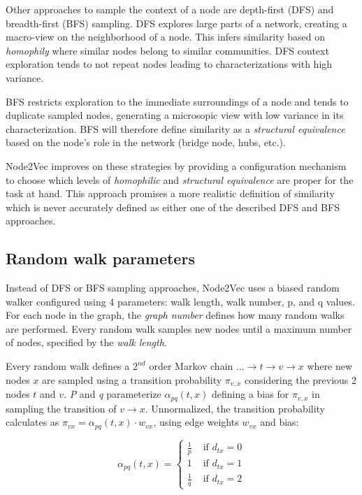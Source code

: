 \documentclass[a4paper,10pt]{article}
\begin{document}
Other approaches to sample the context of a node are depth-first (DFS) and breadth-first (BFS) sampling. DFS explores large parts of a network, creating a macro-view on the neighborhood of a node. This infers similarity based on \textit{homophily} where similar nodes belong to similar communities. DFS context exploration tends to not repeat nodes leading to characterizations with high variance.

BFS restricts exploration to the immediate surroundings of a node and tends to duplicate sampled nodes, generating a microsopic view with low variance in its characterization. BFS will therefore define similarity as a \textit{structural equivalence} based on the node's role in the network (bridge node, hubs, etc.).

Node2Vec improves on these strategies by providing a configuration mechanism to choose which levels of \textit{homophilic} and \textit{structural equivalence} are proper for the task at hand. This approach promises a more realistic definition of similarity which is never accurately defined as either one of the described DFS and BFS approaches.

\subsection{Random walk parameters}

Instead of DFS or BFS sampling approaches, Node2Vec uses a biased random walker configured using 4 parameters: walk length, walk number, p, and q values. For each  node in the graph, the \textit{graph number} defines how many random walks are performed. Every random walk samples new nodes until a maximum number of nodes, specified by the \textit{walk length}.

Every random walk defines a $2^{nd}$ order Markov chain $... \to t \to v \to x$ where new nodes $x$ are sampled using a transition probability $\pi_{v,x}$ considering the previous 2 nodes $t$ and $v$. \textit{P} and \textit{q} parameterize $\alpha_{p q}(t, x)$ defining a bias for $\pi_{v,x}$ in sampling the transition of $v \to x$. Unnormalized, the transition probability calculates as $\pi_{v x}=\alpha_{pq}(t, x) \cdot w_{vx}$, using edge weights $w_{vx}$ and bias:

$$
\alpha_{p q}(t, x)=\left\{\begin{array}{ll}
\frac{1}{p} & \text { if } d_{t x}=0 \\
1 & \text { if } d_{t x}=1 \\
\frac{1}{q} & \text { if } d_{t x}=2
\end{array}\right.
$$
\end{document}
